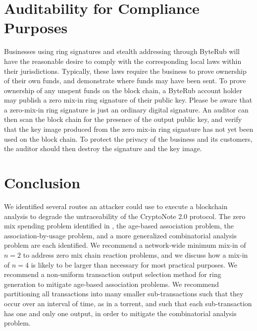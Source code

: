 \documentclass[12pt,english]{mrl}
\theoremstyle{definition}
\numberwithin{equation}{section}
\numberwithin{figure}{section}
\numberwithin{equation}{section}
\numberwithin{equation}{section}
\numberwithin{figure}{section}
\begin{document}

\section{Auditability for Compliance Purposes}\label{auditability}

Businesses using ring signatures and stealth addressing through ByteRub will have the reasonable desire to comply with the corresponding local laws within their jurisdictions. Typically, these laws require the business to prove ownership of their own funds, and demonstrate where funds may have been sent. To prove ownership of any unspent funds on the block chain, a ByteRub account holder may publish a zero mix-in ring signature of their public key. Please be aware that a zero-mix-in ring signature is just an ordinary digital signature. An auditor can then scan the block chain for the presence of the output public key, and verify that the key image produced from the zero mix-in ring signature has not yet been used on the block chain. To protect the privacy of the business and its customers, the auditor should then destroy the signature and the key image.

\section{Conclusion}\label{conclusion}

We identified several routes an attacker could use to execute a blockchain analysis to degrade the untraceability of the CryptoNote 2.0 protocol. The zero mix spending problem identified in \cite{chainReactions}, the age-based association problem, the association-by-usage problem, and a more generalized combinatorial analysis problem are each identified. We recommend a network-wide minimum mix-in of $n=2$ to address zero mix chain reaction problems, and we discuss how a mix-in of $n=4$ is likely to be larger than necessary for most practical purposes. We recommend a non-uniform transaction output selection method for ring generation to mitigate age-based association problems. We recommend partitioning all transactions into many smaller sub-transactions such that they occur over an interval of time, as in a torrent, and such that each sub-transaction has one and only one output, in order to mitigate the combinatorial analysis problem.





\medskip{}



\end{document}
